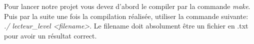 Pour lancer notre projet vous devez d'abord le compiler par la commande \textit{make}. Puis par la suite une fois la compilation réalisée, utiliser la commande suivante: \textit{./ lecteur\_level <filename>}. Le filename doit absolument être un fichier en .txt pour avoir un résultat correct.
\newpage